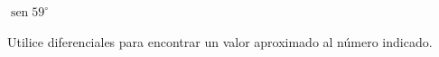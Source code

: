 \item $\operatorname{sen} 59^\circ$
\par
Utilice diferenciales para encontrar un valor aproximado al número indicado.
